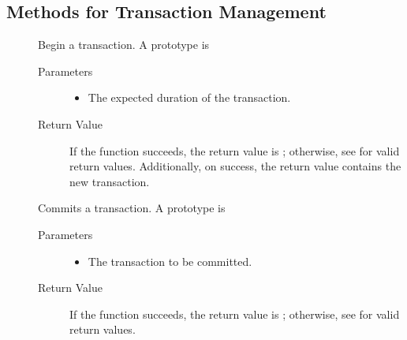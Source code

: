 \subsection{\label{WebService-TransactionManagement} Methods for Transaction Management}

%
%
\begin{description}
\item []
  Begin a transaction.
  A prototype is


  \begin{description}
    \item[Parameters] 
    \begin{itemize}
      \item {} The expected duration of the transaction.
    \end{itemize}
    \item[Return Value] 
      If the function succeeds, the return value is ; 
      otherwise, see  for valid return values. Additionally,
      on success, the return value contains the new transaction.
  \end{description}    
  
\item []
  Commits a transaction.
  A prototype is


  \begin{description}
    \item[Parameters]
    \begin{itemize}
      \item {} The transaction to be committed.
    \end{itemize}
    \item[ Return Value]
      If the function succeeds, the return value is ; 
      otherwise, see  for valid return values. 
  \end{description}  


\end{description}
